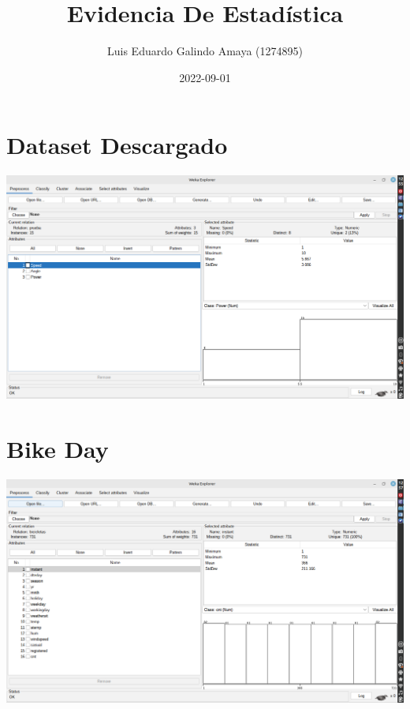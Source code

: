 \documentclass[11pt]{article}
\author{Luis Eduardo Galindo Amaya (1274895)}
\date{2022-09-01}
\title{Evidencia De Estadística}
\begin{document}
\maketitle

\section{Dataset Descargado}
\label{sec:org4c88687}
\begin{center}
\includegraphics[width=.9\linewidth]{./img/descargado.png}
\end{center}

\section{Bike Day}
\label{sec:org089edb5}
\begin{center}
\includegraphics[width=.9\linewidth]{./img/bike_day.png}
\end{center}
\end{document}
